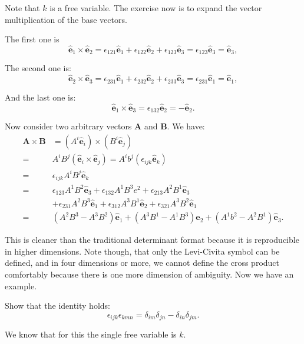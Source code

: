 \documentclass[10pt]{article}
\begin{document}
	Note that $k$ is a free variable. The exercise now is to expand the vector multiplication of the base vectors.
	\begin{exercise}
		The first one is
		\begin{equation}
		  \hat{\mathbf{e}}_1 \times \hat{\mathbf{e}}_2 = \epsilon_{121}\hat{\mathbf{e}}_1 + \epsilon_{122}\hat{\mathbf{e}}_2 + \epsilon_{123}\hat{\mathbf{e}}_3 = \epsilon_{123} \hat{\mathbf{e}}_3 = \hat{\mathbf{e}}_3,
		\end{equation}

		The second one is:
		\begin{equation}
		  \hat{\mathbf{e}}_2 \times \hat{\mathbf{e}}_3 = \epsilon_{231}\hat{\mathbf{e}}_1 + \epsilon_{232}\hat{\mathbf{e}}_2 + \epsilon_{233}\hat{\mathbf{e}}_3 = \epsilon_{231}\hat{\mathbf{e}}_1 = \hat{\mathbf{e}}_1,
		\end{equation}

		And the last one is:
		\begin{equation}
		  \hat{\mathbf{e}}_1 \times \hat{\mathbf{e}}_3 = \epsilon_{132} \hat{\mathbf{e}}_2 = -\hat{\mathbf{e}}_2.
		\end{equation}
	\end{exercise}

	Now consider two arbitrary vectors $\mathbf{A}$ and $\mathbf{B}$. We have:
	\begin{equation}
	  \begin{aligned}
	  \mathbf{A} \times \mathbf{B} &= (A^{i}\hat{\mathbf{e}}_{i}) \times (B^{i}\hat{\mathbf{e}}_{j}) \\
	  =& A^{i}B^{j}(\hat{\mathbf{e}}_{i} \times \hat{\mathbf{e}}_{j}) = A^{i}b^{j}(\epsilon_{ijk}\hat{\mathbf{e}}_{k}) \\
	  =& \epsilon_{ijk} A^{i}B^{j}\hat{\mathbf{e}}_{k} \\
	  =& \epsilon_{123}A^{1}B^{2}\hat{\mathbf{e}}_3 + \epsilon_{132}A^{1}B^{3}e^{2} + \epsilon_{213}A^{2}B^{1}\hat{\mathbf{e}}_3 \\
	  &+ \epsilon_{231}A^{2}B^{3}\hat{\mathbf{e}}_1 + \epsilon_{312}A^{3}B^{1}\hat{\mathbf{e}}_2 + \epsilon_{321}A^{3}B^{2}\hat{\mathbf{e}}_1 \\
	  =& (A^{2}B^{3}-A^{3}B^{2})\hat{\mathbf{e}}_1 + (A^{3}B^{1}-A^{1}B^{3})\hat{\mathbf{e}}_2 + (A^{1}b^{2}-A^{2}B^{1})\hat{\mathbf{e}}_3.
	  \end{aligned}
	\end{equation}

	This is cleaner than the traditional determinant format because it is reproducible in higher dimensions. Note though, that only the Levi-Civita symbol can be defined, and in four dimensions or more, we cannot define the cross product comfortably because there is one more dimension of ambiguity. Now we have an example.
	\begin{example}
		Show that the identity holds:
		\begin{equation}
		  \epsilon_{ijk}\epsilon_{kmn} = \delta_{im}\delta_{jn} - \delta_{in}\delta_{jm}.
		\end{equation}

		We know that for this the single free variable is $k$.
	\end{example}
\end{document}
